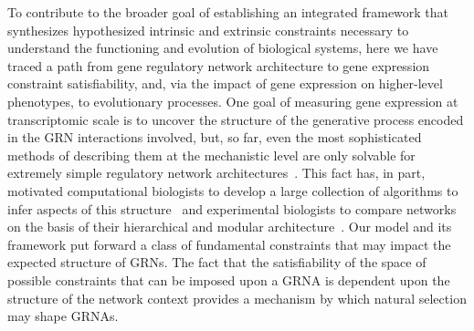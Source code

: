 To contribute to the broader goal of establishing an integrated framework that synthesizes hypothesized intrinsic and extrinsic constraints necessary to understand the functioning and evolution of biological systems, here we have traced a path from gene regulatory network architecture to gene expression constraint satisfiability, and, via the impact of gene expression on higher-level phenotypes, to evolutionary processes. One goal of measuring gene expression at transcriptomic scale is to uncover the structure of the generative process encoded in the GRN interactions involved, but, so far, even the most sophisticated methods of describing them at the mechanistic level are only solvable for extremely simple regulatory network architectures~\cite{Walczak2009,Mugler2009}. This fact has, in part, motivated computational biologists to develop a large collection of algorithms to infer aspects of this structure~\cite{DeSmet2010} and experimental biologists to compare networks on the basis of their hierarchical and modular architecture~\cite{Ideker2012}. Our model and its framework put forward a class of fundamental constraints that may impact the expected structure of GRNs. The fact that the satisfiability of the space of possible constraints that can be imposed upon a GRNA is dependent upon the structure of the network context provides a mechanism by which natural selection may shape GRNAs.

